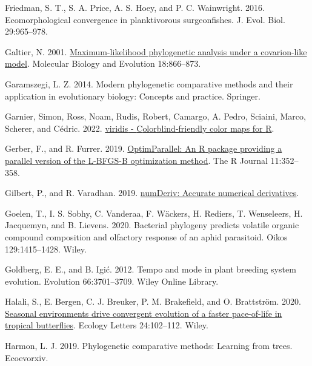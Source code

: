 \documentclass[fleqn,10pt,lineno]{wlpeerj} %
\newlength{\cslhangindent}
\newlength{\cslentryspacingunit} %
\newenvironment{CSLReferences}[2] %
 {%
  \setlength{\parindent}{0pt}
  \ifodd #1
  \let\oldpar\par
  \def\par{\hangindent=\cslhangindent\oldpar}
  \fi
  \setlength{\parskip}{#2\cslentryspacingunit}
 }%
 {}
\begin{document}
\begin{CSLReferences}{1}{0}
\leavevmode{}%
Friedman, S. T., S. A. Price, A. S. Hoey, and P. C. Wainwright. 2016. Ecomorphological convergence in planktivorous surgeonfishes. J. Evol. Biol. 29:965--978.

\leavevmode{}%
Galtier, N. 2001. \href{https://doi.org/10.1093/oxfordjournals.molbev.a003868}{Maximum-likelihood phylogenetic analysis under a covarion-like model}. Molecular Biology and Evolution 18:866--873.

\leavevmode{}%
Garamszegi, L. Z. 2014. Modern phylogenetic comparative methods and their application in evolutionary biology: Concepts and practice. Springer.

\leavevmode{}%
Garnier, Simon, Ross, Noam, Rudis, Robert, Camargo, A. Pedro, Sciaini, Marco, Scherer, and Cédric. 2022. \href{https://doi.org/10.5281/zenodo.4679424}{{viridis} - {C}olorblind-friendly color maps for {R}}.

\leavevmode{}%
Gerber, F., and R. Furrer. 2019. \href{https://doi.org/10.32614/RJ-2019-030}{Optim{P}arallel: An {R} package providing a parallel version of the {L-BFGS-B} optimization method}. The R Journal 11:352--358.

\leavevmode{}%
Gilbert, P., and R. Varadhan. 2019. \href{https://CRAN.R-project.org/package=numDeriv}{numDeriv: Accurate numerical derivatives}.

\leavevmode{}%
Goelen, T., I. S. Sobhy, C. Vanderaa, F. Wäckers, H. Rediers, T. Wenseleers, H. Jacquemyn, and B. Lievens. 2020. Bacterial phylogeny predicts volatile organic compound composition and olfactory response of an aphid parasitoid. Oikos 129:1415--1428. Wiley.

\leavevmode{}%
Goldberg, E. E., and B. Igić. 2012. Tempo and mode in plant breeding system evolution. Evolution 66:3701--3709. Wiley Online Library.

\leavevmode{}%
Halali, S., E. Bergen, C. J. Breuker, P. M. Brakefield, and O. Brattström. 2020. \href{https://doi.org/10.1111/ele.13626}{Seasonal environments drive convergent evolution of a faster pace-of-life in tropical butterflies}. Ecology Letters 24:102--112. Wiley.

\leavevmode{}%
Harmon, L. J. 2019. Phylogenetic comparative methods: Learning from trees. Ecoevorxiv.


\end{CSLReferences}
\end{document}
